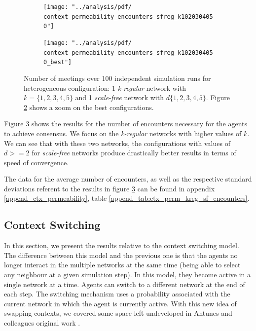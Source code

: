 \documentclass[preprint,number]{elsarticle}
\begin{document}
\begin{figure}[H]
	\centering
	\begin{subfigure}{.49\linewidth}
		\centering
		\texttt{[image: "../analysis/pdf/ context\_permeability\_encounters\_sfreg\_k1020304050"]}
		\caption{}
		\label{fig:ctx_perm_sfkreg_1020304050full}
	\end{subfigure}%
	\begin{subfigure}{.49\linewidth}
		\centering
		\texttt{[image: "../analysis/pdf/  context\_permeability\_encounters\_sfreg\_k1020304050\_best"]}
		\caption{}
		\label{fig:ctx_perm_sfkreg_1020304050best}
	\end{subfigure}
	\begin{minipage}{0.9\linewidth}
		\vspace{0.2cm}
		\caption{Number of meetings over 100 independent simulation runs for heterogeneous configuration: 1 \textit{k-regular} network with  $k=\{1,2,3,4,5\}$ and 1 \textit{scale-free} network with $d\{1,2,3,4,5\}$. Figure \ref{fig:ctx_perm_sfkreg_1020304050best} shows a zoom on the best configurations.}
		\label{fig:ctx_perm_sfkreg}
	\end{minipage}
\end{figure}

Figure \ref{fig:ctx_perm_sfkreg} shows the results for the number of encounters necessary for the agents to achieve consensus. We focus on the \textit{k-regular} networks with higher values of $k$. We can see that with these two networks, the configurations with values of $d>=2$ for \textit{scale-free} networks produce drastically better results in terms of speed of convergence.

The data for the average number of encounters, as well as the respective standard deviations referent to the results in figure \ref{fig:ctx_perm_sfkreg} can be found in appendix \ref{append_ctx_permeability}, table \ref{append_tab:ctx_perm_kreg_sf_encounters}.



\subsection{Context Switching}
In this section, we present the results relative to the context switching model. The difference between this model and the previous one is that the agents no longer interact in the multiple networks at the same time (being able to select any neighbour at a given simulation step). In this model, they become active in a single network at a time. Agents can switch to a different network at the end of each step. The switching mechanism uses a probability associated with the current network in which the agent is currently active. With this new idea of swapping contexts, we covered some space left undeveloped in Antunes and colleagues original work \cite{Antunes2007,Antunes2010}. 
\end{document}
